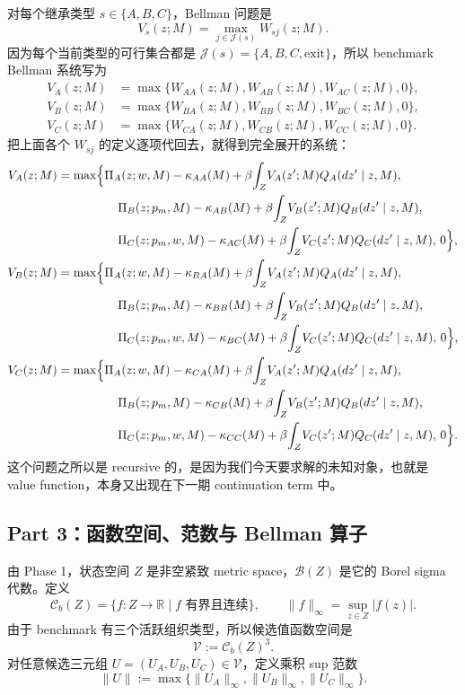 对每个继承类型 $s\in\{A,B,C\}$，Bellman 问题是
\[
V_s(z;M)=\max_{j\in\mathcal J(s)}W_{sj}(z;M).
\]
因为每个当前类型的可行集合都是 $\mathcal J(s)=\{A,B,C,\mathrm{exit}\}$，所以 benchmark Bellman 系统写为
\begin{align*}
V_A(z;M)&=\max\{W_{AA}(z;M),W_{AB}(z;M),W_{AC}(z;M),0\},\\
V_B(z;M)&=\max\{W_{BA}(z;M),W_{BB}(z;M),W_{BC}(z;M),0\},\\
V_C(z;M)&=\max\{W_{CA}(z;M),W_{CB}(z;M),W_{CC}(z;M),0\}.
\end{align*}
把上面各个 $W_{sj}$ 的定义逐项代回去，就得到完全展开的系统：
\begin{align*}
V_A(z;M)
&=
\max\Bigl\{
\Pi_A(z;w,M)-\kappa_{AA}(M)+\beta\!\int_Z\!V_A(z';M)Q_A(dz'\mid z,M),\\
&\hspace{1.75cm}
\Pi_B(z;p_m,M)-\kappa_{AB}(M)+\beta\!\int_Z\!V_B(z';M)Q_B(dz'\mid z,M),\\
&\hspace{1.75cm}
\Pi_C(z;p_m,w,M)-\kappa_{AC}(M)+\beta\!\int_Z\!V_C(z';M)Q_C(dz'\mid z,M),\,0
\Bigr\},\\
V_B(z;M)
&=
\max\Bigl\{
\Pi_A(z;w,M)-\kappa_{BA}(M)+\beta\!\int_Z\!V_A(z';M)Q_A(dz'\mid z,M),\\
&\hspace{1.75cm}
\Pi_B(z;p_m,M)-\kappa_{BB}(M)+\beta\!\int_Z\!V_B(z';M)Q_B(dz'\mid z,M),\\
&\hspace{1.75cm}
\Pi_C(z;p_m,w,M)-\kappa_{BC}(M)+\beta\!\int_Z\!V_C(z';M)Q_C(dz'\mid z,M),\,0
\Bigr\},\\
V_C(z;M)
&=
\max\Bigl\{
\Pi_A(z;w,M)-\kappa_{CA}(M)+\beta\!\int_Z\!V_A(z';M)Q_A(dz'\mid z,M),\\
&\hspace{1.75cm}
\Pi_B(z;p_m,M)-\kappa_{CB}(M)+\beta\!\int_Z\!V_B(z';M)Q_B(dz'\mid z,M),\\
&\hspace{1.75cm}
\Pi_C(z;p_m,w,M)-\kappa_{CC}(M)+\beta\!\int_Z\!V_C(z';M)Q_C(dz'\mid z,M),\,0
\Bigr\}.
\end{align*}
这个问题之所以是 recursive 的，是因为我们今天要求解的未知对象，也就是 value function，本身又出现在下一期 continuation term 中。

\subsection{Part 3：函数空间、范数与 Bellman 算子}

由 Phase 1，状态空间 $Z$ 是非空紧致 metric space，$\mathcal B(Z)$ 是它的 Borel sigma 代数。定义
\[
\mathcal C_b(Z)=\{f:Z\to\mathbb R\mid f\text{ 有界且连续}\},
\qquad
\|f\|_\infty=\sup_{z\in Z}|f(z)|.
\]
由于 benchmark 有三个活跃组织类型，所以候选值函数空间是
\[
\mathcal V:=\mathcal C_b(Z)^3.
\]
对任意候选三元组 $U=(U_A,U_B,U_C)\in\mathcal V$，定义乘积 sup 范数
\[
\|U\|:=\max\{\|U_A\|_\infty,\|U_B\|_\infty,\|U_C\|_\infty\}.
\]

